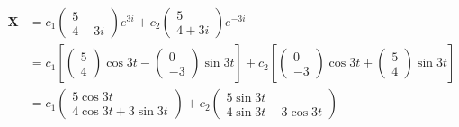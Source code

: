 \documentclass{article}
\begin{document}
\begin{align*}
  \mathbf{X} & = c_1 \begin{pmatrix}
                       5 \\
                       4 - 3 i
                     \end{pmatrix} e^{3 i} + c_2 \begin{pmatrix}
                                                   5 \\
                                                   4 + 3 i
                                                 \end{pmatrix} e^{-3 i}                                                                                  \\
             & = c_1 \left[ \begin{pmatrix}
                                5 \\
                                4
                              \end{pmatrix} \cos 3 t - \begin{pmatrix}
                                                         0 \\
                                                         -3
                                                       \end{pmatrix} \sin 3 t \right] + c_2 \left[ \begin{pmatrix}
                                                                                                     0 \\
                                                                                                     -3
                                                                                                   \end{pmatrix} \cos 3 t + \begin{pmatrix}
                                                                                                                              5 \\
                                                                                                                              4
                                                                                                                            \end{pmatrix} \sin 3 t \right] \\
             & = c_1 \begin{pmatrix}
                       5 \cos 3 t \\
                       4 \cos 3 t + 3 \sin 3 t
                     \end{pmatrix} + c_2 \begin{pmatrix}
                                           5 \sin 3 t \\
                                           4 \sin 3 t - 3 \cos 3 t
                                         \end{pmatrix}
\end{align*}
\end{document}
